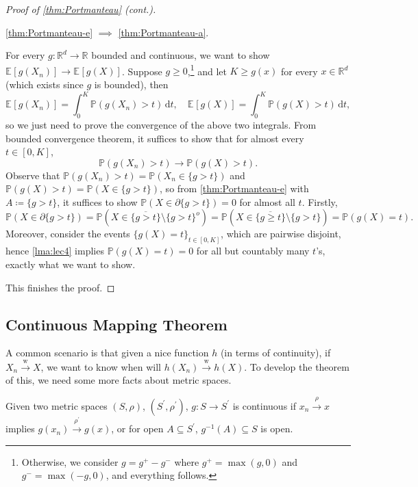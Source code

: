 \begin{proof}[Proof of \autoref{thm:Portmanteau} (cont.)]
	\begin{claim}
		\autoref{thm:Portmanteau-e} \(\implies \) \autoref{thm:Portmanteau-a}.
	\end{claim}
	\begin{explanation}
		For every \(g \colon \mathbb{R} ^d \to \mathbb{R} \) bounded and continuous, we want to show \(\mathbb{E}_{}\left[g(X_n) \right] \to \mathbb{E}_{}\left[g(X) \right] \). Suppose \(g \geq 0\),\footnote{Otherwise, we consider \(g = g^+ - g^-\) where \(g^+ = \max (g, 0)\) and \(g^- = \max (-g, 0)\), and everything follows.} and let \(K \geq g(x)\) for every \(x \in \mathbb{R} ^d\) (which exists since \(g\) is bounded), then
		\[
			\mathbb{E}_{}\left[g(X_n) \right]
			= \int_{0}^{K} \mathbb{P} (g(X_n) > t) \,\mathrm{d}t , \quad
			\mathbb{E}_{}\left[g(X) \right]
			= \int_{0}^{K} \mathbb{P} (g(X) > t) \,\mathrm{d}t,
		\]
		so we just need to prove the convergence of the above two integrals. From bounded convergence theorem, it suffices to show that for almost every \(t \in [0, K]\),
		\[
			\mathbb{P} (g(X_n) > t) \to \mathbb{P} (g(X) > t).
		\]
		Observe that \(\mathbb{P} (g(X_n) > t) = \mathbb{P} (X_n \in \{ g > t \} )\) and \(\mathbb{P} (g(X) > t) = \mathbb{P} (X \in \{ g > t \} )\), so from \autoref{thm:Portmanteau-e} with \(A\coloneqq \{ g > t \} \), it suffices to show \(\mathbb{P} (X \in \partial \{ g > t \} ) = 0\) for almost all \(t\). Firstly,
		\[
			\mathbb{P} (X \in \partial \{ g > t \} )
			= \mathbb{P} (X \in \overline{\{ g > t \} } \setminus \{ g > t \}^o )
			= \mathbb{P} (X \in \overline{\{ g \geq t \} } \setminus \{ g > t \} )
			= \mathbb{P} (g(X) = t ).
		\]
		Moreover, consider the events \(\{ g(X) = t \} _{t \in [0, K]}\), which are pairwise disjoint, hence \autoref{lma:lec4} implies \(\mathbb{P} (g(X) = t) = 0\) for all but countably many \(t\)'s, exactly what we want to show.
	\end{explanation}
	This finishes the proof.
\end{proof}

\subsection{Continuous Mapping Theorem}
A common scenario is that given a nice function \(h\) (in terms of continuity), if \(X_n \overset{\text{w} }{\to } X\), we want to know when will \(h(X_n) \overset{\text{w} }{\to } h(X)\). To develop the theorem of this, we need some more facts about metric spaces.

\begin{prev}
	Given two metric spaces \((S, \rho )\), \((S^{\prime} , \rho ^{\prime} )\), \(g\colon S \to S^{\prime} \) is continuous if \(x_n \overset{\rho }{\to } x\) implies \(g(x_n) \overset{\rho ^{\prime} }{\to } g(x)\), or for open \(A \subseteq S^{\prime} \), \(g^{-1} (A) \subseteq S\) is open.
\end{prev}

